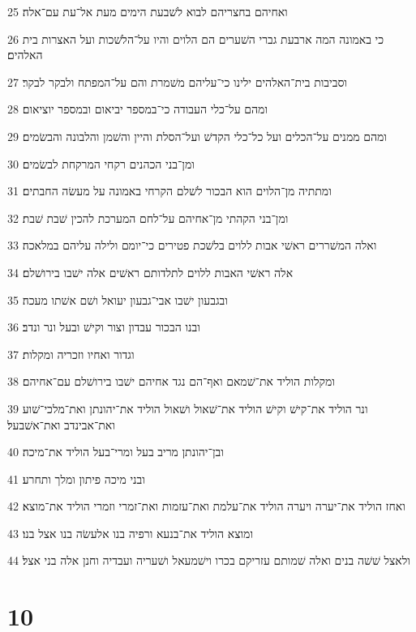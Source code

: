 \par 25 ואחיהם בחצריהם לבוא לשׁבעת הימים מעת אל־עת עם־אלה׃
\par 26 כי באמונה המה ארבעת גברי השׁערים הם הלוים והיו על־הלשׁכות ועל האצרות בית האלהים׃
\par 27 וסביבות בית־האלהים ילינו כי־עליהם משׁמרת והם על־המפתח ולבקר לבקר׃
\par 28 ומהם על־כלי העבודה כי־במספר יביאום ובמספר יוציאום׃
\par 29 ומהם ממנים על־הכלים ועל כל־כלי הקדשׁ ועל־הסלת והיין והשׁמן והלבונה והבשׂמים׃
\par 30 ומן־בני הכהנים רקחי המרקחת לבשׂמים׃
\par 31 ומתתיה מן־הלוים הוא הבכור לשׁלם הקרחי באמונה על מעשׂה החבתים׃
\par 32 ומן־בני הקהתי מן־אחיהם על־לחם המערכת להכין שׁבת שׁבת׃
\par 33 ואלה המשׁררים ראשׁי אבות ללוים בלשׁכת פטירים כי־יומם ולילה עליהם במלאכה׃
\par 34 אלה ראשׁי האבות ללוים לתלדותם ראשׁים אלה ישׁבו בירושׁלם׃
\par 35 ובגבעון ישׁבו אבי־גבעון יעואל ושׁם אשׁתו מעכה׃
\par 36 ובנו הבכור עבדון וצור וקישׁ ובעל ונר ונדב׃
\par 37 וגדור ואחיו וזכריה ומקלות׃
\par 38 ומקלות הוליד את־שׁמאם ואף־הם נגד אחיהם ישׁבו בירושׁלם עם־אחיהם׃
\par 39 ונר הוליד את־קישׁ וקישׁ הוליד את־שׁאול ושׁאול הוליד את־יהונתן ואת־מלכי־שׁוע ואת־אבינדב ואת־אשׁבעל׃
\par 40 ובן־יהונתן מריב בעל ומרי־בעל הוליד את־מיכה׃
\par 41 ובני מיכה פיתון ומלך ותחרע׃
\par 42 ואחז הוליד את־יערה ויערה הוליד את־עלמת ואת־עזמות ואת־זמרי וזמרי הוליד את־מוצא׃
\par 43 ומוצא הוליד את־בנעא ורפיה בנו אלעשׂה בנו אצל בנו׃
\par 44 ולאצל שׁשׁה בנים ואלה שׁמותם עזריקם בכרו וישׁמעאל ושׁעריה ועבדיה וחנן אלה בני אצל׃

\chapter{10}

